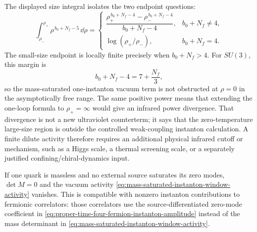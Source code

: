 \begin{controlledapproximation}
The displayed size integral isolates the two endpoint questions:
\begin{equation}
  \int_{\rho_-}^{\rho_+}
  \rho^{\,b_0+N_f-5}\,\dd\rho
  =
  \begin{cases}
    \dfrac{\rho_+^{\,b_0+N_f-4}-\rho_-^{\,b_0+N_f-4}}
          {b_0+N_f-4},
      & b_0+N_f\ne4,\\[10pt]
    \log(\rho_+/\rho_-),
      & b_0+N_f=4 .
  \end{cases}
  \label{eq:mass-saturated-size-window-integral}
\end{equation}
The small-size endpoint is locally finite precisely when
\(b_0+N_f>4\).  For \(SU(3)\), this margin is
\[
  b_0+N_f-4
  =
  7+\frac{N_f}{3},
\]
so the mass-saturated one-instanton vacuum term is not obstructed at
\(\rho=0\) in the asymptotically free range.  The same positive power means
that extending the one-loop formula to \(\rho_+=\infty\) would give an
infrared power divergence.  That divergence is not a new ultraviolet
counterterm; it says that the zero-temperature large-size region is outside
the controlled weak-coupling instanton calculation.  A finite dilute activity
therefore requires an additional physical infrared cutoff or mechanism, such
as a Higgs scale, a thermal screening scale, or a separately justified
confining/chiral-dynamics input.

If one quark is massless and no external source saturates its zero modes,
\(\det M=0\) and the vacuum activity
\eqref{eq:mass-saturated-instanton-window-activity} vanishes.  This is
compatible with nonzero instanton contributions to fermionic correlators:
those correlators use the source-differentiated zero-mode coefficient in
\eqref{eq:proper-time-four-fermion-instanton-amplitude} instead of the mass
determinant in \eqref{eq:mass-saturated-instanton-window-activity}.
\end{controlledapproximation}

